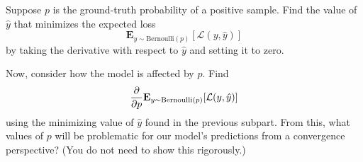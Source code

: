 \documentclass[11pt]{article}
\begin{document}
    \begin{subparts}
        \subpart Suppose $p$ is the ground-truth probability of a positive sample. Find the value of $\hat{y}$ that minimizes the expected loss
        $$\mathbf{E}_{y \sim \text{Bernoulli}(p)}\left[\mathcal{L}(y, \hat{y})\right]$$ by taking the derivative with respect to $\hat{y}$ and setting it to zero.


        \subpart Now, consider how the model is affected by $p$. Find 
        $$\pdv{}{p} \mathbf{E}_{y \sim \text{Bernoulli}(p)}[\mathcal{L}(y, \hat{y})]$$
        using the minimizing value of $\hat{y}$ found in the previous subpart. From this, what values of $p$ will be problematic for our model's predictions from a convergence perspective? (You do not need to show this rigorously.)



\end{subparts}
\end{document}
